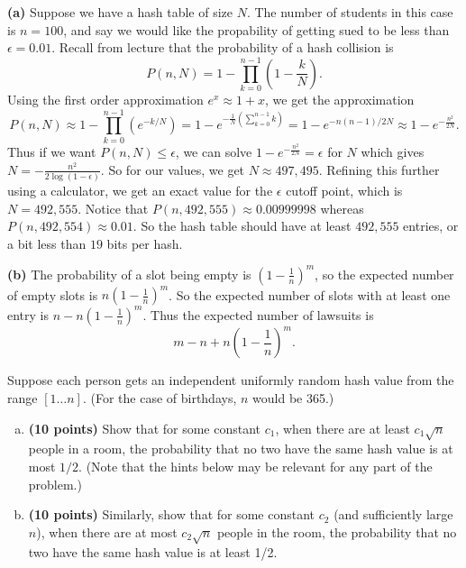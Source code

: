 \documentclass[11pt,letterpaper]{article}
\begin{document}
\begin{solution}
    \textbf{(a)} Suppose we have a hash table of size $N$. The number of students in this case is $n=100$, and say we would like the propability of getting sued to be less than $\epsilon = 0.01$. Recall from lecture that the probability of a hash collision is
    \[
        P(n, N) = 1-\prod^{n-1}_{k=0}\left(1-\frac{k}{N}\right)
    .\] 
    Using the first order approximation $e^x\approx 1+x$, we get the approximation 
    \[
        P(n,N)\approx 1-\prod^{n-1}_{k=0}\left(e^{-k /N}\right) = 1-e^{-\frac{1}{N}\left(\sum^{n-1}_{k=0}k\right)} = 1-e^{-n(n-1) /2N} \approx 1-e^{-\frac{n^2}{2N}}
    .\] 
    Thus if we want $P(n,N)\leq \epsilon$, we can solve $1-e^{-\frac{n^2}{2N}}=\epsilon$ for $N$ which gives $N=-\frac{n^2}{2\log(1-\epsilon)}$. So for our values, we get $N\approx 497,495$. Refining this further using a calculator, we get an exact value for the $\epsilon$ cutoff point, which is $N=492,555$. Notice that $P(n,492,555)\approx 0.00999998$ whereas $P(n,492,554)\approx 0.01$. So the hash table should have at least $492,555$ entries, or a bit less than $19$ bits per hash.

    \textbf{(b)} The probability of a slot being empty is $\left(1-\frac{1}{n}\right)^m$, so the expected number of empty slots is $n\left(1-\frac{1}{n}\right)^m$. So the expected number of slots with at least one entry is $n-n\left(1-\frac{1}{n}\right)^m$. Thus the expected number of lawsuits is
    \[
        m - n + n\left(1-\frac{1}{n}\right)^m
    .\]  
\end{solution}

\pagebreak
\begin{problem}
    Suppose each person gets an independent uniformly random hash value from the range $[1\ldots n]$.  (For the case of birthdays, $n$ would be 365.) 
    \begin{enumerate}[(a)]
        \item {\bf (10 points)} Show that for some constant $c_1$, when there are at least $c_1 \sqrt{n}$ people in a room, the probability that no two have the same hash value is at most $1/2$. (Note that the hints below may be relevant for any part of the problem.)
        \item {\bf (10 points)} Similarly, show that for some constant $c_2$ (and sufficiently large $n$), when there are at most $c_2 \sqrt{n}$ people in the room, the probability that no two have the same hash value is at least 1/2. 
\end{enumerate}
\end{problem}
\end{document}
